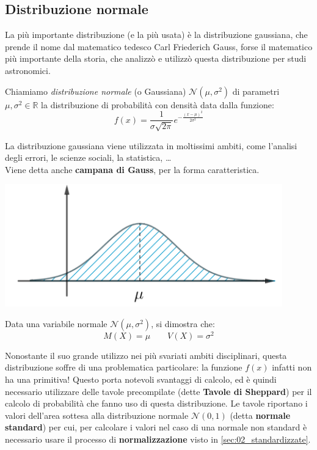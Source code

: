 \subsection{Distribuzione normale}

La più importante distribuzione (e la più usata)  è la distribuzione gaussiana, che prende il nome dal matematico tedesco Carl Friederich Gauss, forse il matematico più importante della storia, che analizzò e utilizzò questa distribuzione per studi astronomici.

\begin{definizione} Chiamiamo \emph{distribuzione normale} (o Gaussiana) $\mathcal{N}(\mu,\sigma^2)$ di parametri $\mu, \sigma^2 \in \mathbb{R}$ la distribuzione di probabilità con densità data dalla funzione:
\[f(x) =  \frac{1}{\sigma \sqrt{2 \pi}} e^{-\frac{(x-\mu)^2}{2 \sigma^2}}\]
\end{definizione}

\begin{minipage}[c]{.45\textwidth}
La distribuzione gaussiana viene utilizzata in moltissimi ambiti, come l'analisi degli errori, le scienze sociali, la statistica, \dots \\
Viene detta anche \textbf{campana di Gauss}, per la forma caratteristica.
\end{minipage}
\begin{minipage}[c]{.55\textwidth}
\begin{center}
  \includegraphics[width=0.9\textwidth]{img/Normale.png}
\end{center}
\end{minipage}

\begin{proprieta} Data una variabile normale $\mathcal{N}(\mu, \sigma^2)$, si dimostra che: 
\[\boxed{M(X) =\mu} \qquad \boxed{V(X) = \sigma^2}\]
\end{proprieta}

Nonostante il suo grande utilizzo nei più svariati ambiti disciplinari, questa distribuzione soffre di una problematica particolare: la funzione $f(x)$ infatti non ha una primitiva! Questo porta notevoli svantaggi di calcolo, ed è quindi necessario utilizzare delle tavole precompilate (dette \textbf{Tavole di Sheppard}) per il calcolo di probabilità che fanno uso di questa distribuzione. Le tavole riportano i valori dell'area sottesa alla distribuzione normale $\mathcal{N} (0,1)$ (detta \textbf{normale standard}) per cui, per calcolare i valori nel caso di una normale non standard è necessario usare il processo di \textbf{normalizzazione} visto in \ref{sec:02_standardizzate}.

